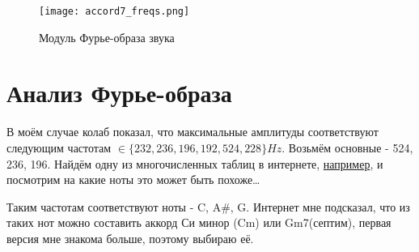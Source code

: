 \begin{figure}[ht]
    \centering
    \texttt{[image: accord7\_freqs.png]}
    \caption{Модуль Фурье-образа звука}
\end{figure}


\section{Анализ Фурье-образа}

В моём случае колаб показал, что максимальные амплитуды соответствуют следующим частотам $\in \{232,236,196,192,524,228\}Hz$. Возьмём основные - 524, 236, 196. Найдём одну из многочисленных таблиц в интернете, \href{https://mixbutton.com/mixing-articles/music-note-to-frequency-chart/}{например}, и посмотрим на какие ноты это может быть похоже\dots

Таким частотам соответствуют ноты - C, A\#, G. Интернет мне подсказал, что из таких нот можно составить аккорд Си минор (Cm) или Gm7(септим), первая версия мне знакома больше, поэтому выбираю её.
 







\endinput